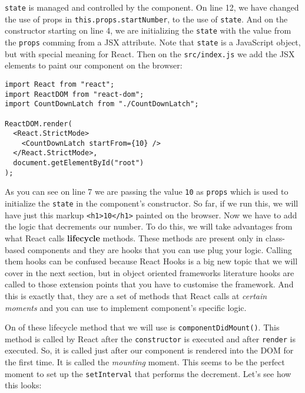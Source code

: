 \documentclass[a4paper, oneside, titlepage, 12pt]{book}
\begin{document}
\texttt{state} is managed and controlled by the component. On line 12, we have changed the use of props in \texttt{this.props.startNumber}, to the use of \texttt{state}. And on the constructor starting on line 4, we are initializing the \texttt{state} with the value from the \texttt{props} comming from a JSX attribute. Note that \texttt{state} is a JavaScript object, but with special meaning for React. Then on the \texttt{src/index.js} we add the JSX elements to paint our component on the browser:

\begin{verbatim}
import React from "react";
import ReactDOM from "react-dom";
import CountDownLatch from "./CountDownLatch";

ReactDOM.render(
  <React.StrictMode>
    <CountDownLatch startFrom={10} />
  </React.StrictMode>,
  document.getElementById("root")
);
\end{verbatim}

As you can see on line 7 we are passing the value \texttt{10} as \texttt{props} which is used to initialize the \texttt{state} in the component's constructor. So far, if we run this, we will have just this markup \texttt{<h1>10</h1>} painted on the browser. Now we have to add the logic that decrements our number. To do this, we will take advantages from what React calls \textbf{lifecycle} methods. These methods are present only in class-based components and they are hooks that you can use plug your logic. Calling them hooks can be confused because React Hooks is a big new topic that we will cover in the next section, but in object oriented frameworks literature hooks are called to those extension points that you have to customise the framework. And this is exactly that, they are a set of methods that React calls at \textit{certain moments} and you can use to implement component's specific logic.
\newline

On of these lifecycle method that we will use is \texttt{componentDidMount()}. This method is called by React after the \texttt{constructor} is executed and after \texttt{render} is executed. So, it is called just after our component is rendered into the DOM for the first time. It is called the \textit{mounting} moment. This seems to be the perfect moment to set up the \texttt{setInterval} that performs the decrement. Let's see how this looks:
\end{document}
